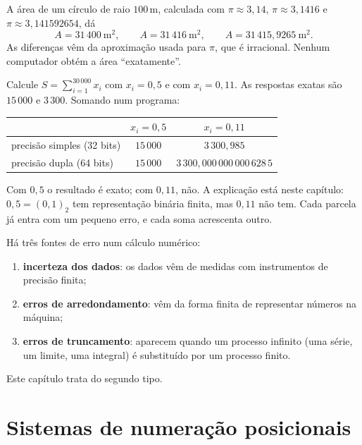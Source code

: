 \begin{exemplo}
A área de um círculo de raio $100$\,m, calculada com $\pi\approx3{,}14$, $\pi\approx3{,}1416$ e
$\pi\approx3{,}141592654$, dá
\[
A=31\,400\ \text{m}^2,\qquad A=31\,416\ \text{m}^2,\qquad A=31\,415{,}9265\ \text{m}^2 .
\]
As diferenças vêm da aproximação usada para $\pi$, que é irracional. Nenhum computador obtém
a área ``exatamente''.
\end{exemplo}

\begin{exemplo}[{: um somatório}]
Calcule $S=\sum_{i=1}^{30\,000}x_i$ com $x_i=0{,}5$ e com $x_i=0{,}11$. As respostas exatas são
$15\,000$ e $3\,300$. Somando num programa:

\begin{center}
\begin{tabular}{lcc}
\toprule
 & $x_i=0{,}5$ & $x_i=0{,}11$\\
\midrule
precisão simples (32 bits) & $15\,000$ & $3\,300{,}985$\\
precisão dupla (64 bits)   & $15\,000$ & $3\,300{,}000\,000\,000\,628\,5$\\
\bottomrule
\end{tabular}
\end{center}

Com $0{,}5$ o resultado é exato; com $0{,}11$, não. A explicação está neste capítulo:
$0{,}5=(0{,}1)_2$ tem representação binária finita, mas $0{,}11$ não tem. Cada parcela já entra
com um pequeno erro, e cada soma acrescenta outro.
\end{exemplo}



Há três fontes de erro num cálculo numérico:
\begin{enumerate}[nosep]
  \item \textbf{incerteza dos dados}: os dados vêm de medidas com instrumentos de precisão finita;
  \item \textbf{erros de arredondamento}: vêm da forma finita de representar números na máquina;
  \item \textbf{erros de truncamento}: aparecem quando um processo infinito (uma série, um limite,
        uma integral) é substituído por um processo finito.
\end{enumerate}
Este capítulo trata do segundo tipo.

\section{Sistemas de numeração posicionais}

